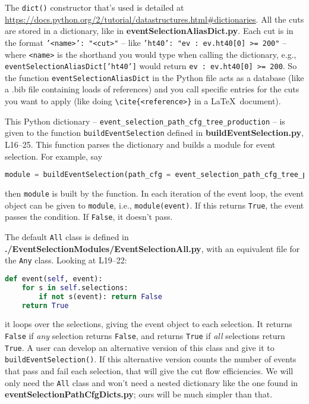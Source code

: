 The \verb!dict()! constructor that's used is detailed at \url{https://docs.python.org/2/tutorial/datastructures.html#dictionaries}. All the cuts are stored in a dictionary, like in \textbf{eventSelectionAliasDict.py}. Each cut is in the format \texttt{'<name>': "<cut>"} -- like \texttt{'ht40': "ev : ev.ht40[0] >= 200"} -- where \verb!<name>! is the shorthand you would type when calling the dictionary, e.g., \texttt{eventSelectionAliasDict['ht40']} would return \texttt{ev : ev.ht40[0] >= 200}. So the function \verb!eventSelectionAliasDict! in the Python file acts as a database (like a .bib file containing loads of references) and you call specific entries for the cuts you want to apply (like doing \verb!\cite{<reference>}! in a \LaTeX\ document).

This Python dictionary -- \texttt{event\_selection\_path\_cfg\_tree\_production} -- is given to the function \texttt{buildEventSelection} defined in \textbf{buildEventSelection.py}, L16--25. This function parses the dictionary and builds a module for event selection. For example, say

\begin{lstlisting}[belowskip=-0.7cm, language=python, numbers=none]
module = buildEventSelection(path_cfg = event_selection_path_cfg_tree_production)
\end{lstlisting}

then \verb!module! is built by the function. In each iteration of the event loop, the event object can be given to \verb!module!, i.e., \verb!module(event)!. If this returns \verb!True!, the event passes the condition. If \verb!False!, it doesn't pass.

The default \verb!All! class is defined in \textbf{./EventSelectionModules/EventSelectionAll.py}, with an equivalent file for the \verb!Any! class. Looking at L19--22:

\begin{lstlisting}[belowskip=-0.7cm, language=python, numbers=none]
def event(self, event):
	for s in self.selections:
		if not s(event): return False
	return True
\end{lstlisting}

it loops over the selections, giving the event object to each selection. It returns \verb!False! if \emph{any} selection returns \verb!False!, and returns \verb!True! if \emph{all} selections return \verb!True!. A user can develop an alternative version of this class and give it to \texttt{buildEventSelection()}. If this alternative version counts the number of events that pass and fail each selection, that will give the cut flow efficiencies. We will only need the \verb!All! class and won't need a nested dictionary like the one found in \textbf{eventSelectionPathCfgDicts.py}; ours will be much simpler than that.

